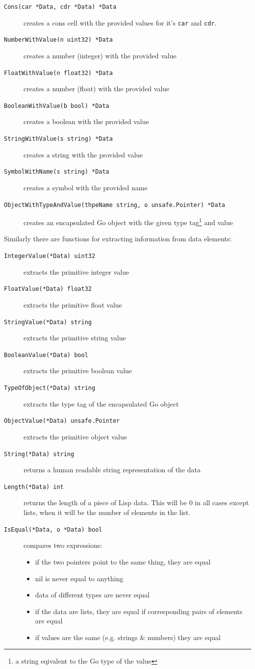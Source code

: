 \documentclass[12pt]{article}
\begin{document}
\begin{description}
\item [{\tt Cons(car *Data, cdr *Data) *Data}] creates a cons cell
  with the provided values for it's \verb|car| and \verb|cdr|.
\item [{\tt NumberWithValue(n uint32) *Data}] creates a number (integer)
  with the provided value
\item [{\tt FloatWithValue(n float32) *Data}] creates a number (float)
  with the provided value
\item [{\tt BooleanWithValue(b bool) *Data}] creates a boolean with
  the provided value
\item [{\tt StringWithValue(s string) *Data}] creates a string with
  the provided value
\item [{\tt SymbolWithName(s string) *Data}] creates a symbol with the
  provided name
\item [{\tt ObjectWithTypeAndValue(thpeName string, o unsafe.Pointer) *Data}]
  creates an encapsulated Go object with the given type tag\footnote{a
    string eqivalent to the Go type of the value} and value
\end{description}

\noindent Similarly there are functions for extracting information
from data elements:

\begin{description}
\item [{\tt IntegerValue(*Data) uint32}] extracts the primitive integer value
\item [{\tt FloatValue(*Data) float32}] extracts the primitive float value
\item [{\tt StringValue(*Data) string}] extracts the primitive
  string value
\item [{\tt BooleanValue(*Data) bool}] extracts the primitive
  boolean value
\item [{\tt TypeOfObject(*Data) string}] extracts the type tag of the
    encapsulated Go object
\item [{\tt ObjectValue(*Data) unsafe.Pointer}] extracts the
  primitive object value
\item [{\tt String(*Data) string}] returns a human readable string
  representation of the data
\item [{\tt Length(*Data) int}] returns the length of a piece of Lisp
  data. This will be 0 in all cases except lists, when it will be the
  number of elements in the list.
\item [{\tt IsEqual(*Data, o *Data) bool}] compares two expressions:
  \begin{itemize}
  \item if the two pointers point to the same thing, they are equal
  \item nil is never equal to anything
  \item data of different types are never equal
  \item if the data are lists, they are equal if corresponding pairs
    of elements are equal
  \item if values are the same (e.g. strings \& numbers) they are equal
  \end{itemize}
\end{description}
\end{document}

